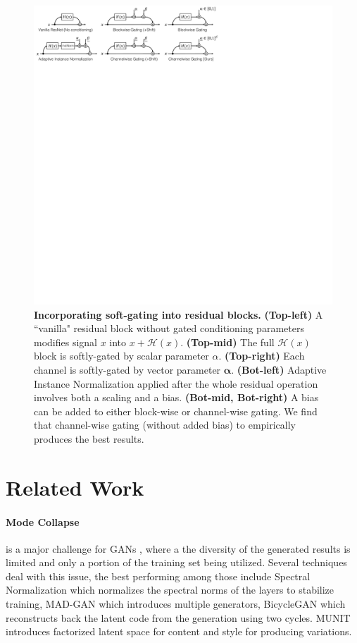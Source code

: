 \begin{figure}[t]
    \centering
    \includegraphics[width=\linewidth]{paper_images/arch_gate.pdf}
    \caption{{\bf Incorporating soft-gating into residual blocks.}  {\bf (Top-left)} A ``vanilla" residual block without gated conditioning parameters modifies signal $x$ into $x+\mathcal{H}(x)$. {\bf (Top-mid)} The full $\mathcal{H}(x)$ block is softly-gated by scalar parameter $\alpha$. {\bf (Top-right)} Each channel is softly-gated by vector parameter $\mathbf{\alpha}$. {\bf (Bot-left)} Adaptive Instance Normalization applied after the whole residual operation involves both a scaling and a bias. {\bf (Bot-mid, Bot-right)} A bias can be added to either block-wise or channel-wise gating. We find that channel-wise gating (without added bias) to empirically produces the best results.\label{fig:arch-gate} }
\end{figure}

\section{Related Work}
\paragraph{Mode Collapse} is a major challenge for GANs \cite{goodfellow2014generative}, where a the diversity of the generated results is limited and only a portion of the training set being utilized. Several techniques deal with this issue, the best performing among those include Spectral Normalization \cite{miyato2018spectral} which normalizes the spectral norms of the layers to stabilize training, MAD-GAN \cite{ghosh2017multi} which introduces multiple generators, BicycleGAN \cite{zhu2017toward} which reconstructs back the latent code from the generation using two cycles. MUNIT \cite{huang2018multimodal} introduces factorized latent space for content and style for producing variations.

